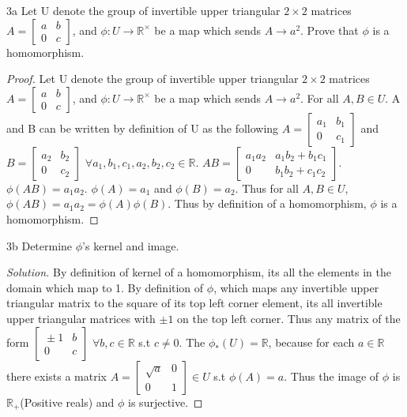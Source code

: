 \documentclass{article}
\newcommand{\R}{\mathbb{R}}
\newenvironment{solution}
{\renewcommand\qedsymbol{$\blacksquare$}\begin{proof}[Solution]}
{\end{proof}}
\begin{document}
\begin{claim}{3a}
    Let U denote the group of invertible upper triangular $2 \times 2$ matrices $A = \begin{bmatrix}{}
        a & b \\
        0 & c
    \end{bmatrix}$, and $\phi: U \to \R^\times$ be a map which sends $A \to a^2$. Prove that $\phi$ is a homomorphism.
\end{claim}
\begin{proof}
    Let U denote the group of invertible upper triangular $2 \times 2$ matrices $A = \begin{bmatrix}{}
        a & b \\
        0 & c
    \end{bmatrix}$, and $\phi: U \to \R^\times$ be a map which sends $A \to a^2$. For all $A, B \in U$. A and B can be written by definition of U as the following $A = \begin{bmatrix}{}
        a_1 & b_1 \\
        0 & c_1
    \end{bmatrix}$ and $B = \begin{bmatrix}{}
        a_2 & b_2 \\
        0 & c_2
    \end{bmatrix}$ $\forall a_1, b_1, c_1, a_2, b_2, c_2 \in \R$. $AB = \begin{bmatrix}{}
        a_1a_2 & a_1b_2 + b_1c_1 \\
        0 & b_1b_2 + c_1c_2
    \end{bmatrix}$. $\phi(AB) = a_1a_2$. $\phi(A) = a_1$ and $\phi(B) = a_2$. Thus for all $A,B \in U$, $\phi(AB) = a_1a_2 = \phi(A)\phi(B)$. Thus by definition of a homomorphism, $\phi$ is a homomorphism.
\end{proof}

\begin{PROB}{3b}\label{Problem 3b.}
    Determine $\phi$'s kernel and image.
\end{PROB}
\begin{solution}
    By definition of kernel of a homomorphism, its all the elements in the domain which map to 1. By definition of $\phi$, which maps any invertible upper triangular matrix to the square of its top left corner element, its all invertible upper triangular matrices with $\pm 1$ on the top left corner. Thus any matrix of the form $\begin{bmatrix}{}
        \pm 1 & b \\
        0 & c
    \end{bmatrix}$ $\forall b, c \in \R$ s.t $c \neq 0$. The $\phi_*(U) = \R$, because for each $a \in \R$ there exists a matrix $A = \begin{bmatrix}{}
        \sqrt{a} & 0 \\
        0 & 1
    \end{bmatrix} \in U$ s.t $\phi(A) = a$. Thus the image of $\phi$ is $\R_+$(Positive reals) and $\phi$ is surjective.
\end{solution}
\bigskip
\end{document}
